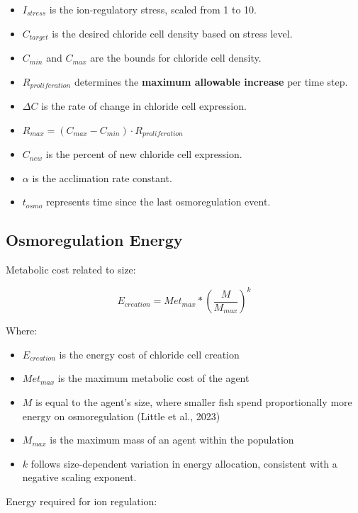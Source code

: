 \documentclass[
]{book}
\providecommand{\tightlist}{%
  \setlength{\itemsep}{0pt}\setlength{\parskip}{0pt}}
\begin{document}
\begin{itemize}
\tightlist
\item
  \(I_{stress}\) is the ion-regulatory stress, scaled from 1 to 10.
\item
  \(C_{target}\) is the desired chloride cell density based on stress level.
\item
  \(C_{min}\) and \(C_{max}\) are the bounds for chloride cell density.
\item
  \(R_{proliferation}\) determines the \textbf{maximum allowable increase} per time step.
\item
  \(\Delta C\) is the rate of change in chloride cell expression.
\item
  \(R_{max} = (C_{max} - C_{min}) \cdot R_{proliferation}\)
\item
  \(C_{new}\) is the percent of new chloride cell expression.
\item
  \(\alpha\) is the acclimation rate constant.
\item
  \(t_{osmo}\) represents time since the last osmoregulation event.
\end{itemize}

\subsection*{Osmoregulation Energy}\label{osmoregulation-energy}

Metabolic cost related to size:

\[
E_{creation} = Met_{max} * (\frac{M}{M_{max}})^k
\]

Where:

\begin{itemize}
\item
  \(E_{creation}\) is the energy cost of chloride cell creation
\item
  \(Met_{max}\) is the maximum metabolic cost of the agent
\item
  \(M\) is equal to the agent's size, where smaller fish spend proportionally more energy on osmoregulation (Little et al., 2023)
\item
  \(M_{max}\) is the maximum mass of an agent within the population
\item
  \(k\) follows size-dependent variation in energy allocation, consistent with a negative scaling exponent.
\end{itemize}

Energy required for ion regulation:
\end{document}
